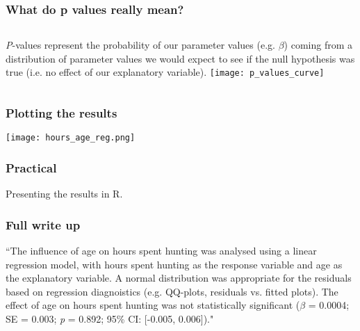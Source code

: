 \documentclass{beamer}
\begin{document}
\begin{frame}
  \frametitle{What do p values really mean?}
  \begin{columns}
  \textit{P}-values represent the probability of our parameter values (e.g. $\beta$) coming from a distribution of parameter values we would expect to see if the null hypothesis was true (i.e. no effect of our explanatory variable).  \vspace{0.5cm}
  \texttt{[image: p\_values\_curve]}
\end{columns}
\end{frame}
\begin{frame}
  \frametitle{Plotting the results}
  \centering
  \texttt{[image: hours\_age\_reg.png]}
\end{frame}
\begin{frame}
  \frametitle{Practical}
  Presenting the results in R.
\end{frame}
\begin{frame}
  \frametitle{Full write up}
  \begin{block}{}
    ``The influence of age on hours spent hunting was analysed using a linear regression model, with hours spent hunting as the response variable and age as the explanatory variable. A normal distribution was appropriate for the residuals based on regression diagnoistics (e.g. QQ-plots, residuals vs. fitted plots). The effect of age on hours spent hunting was not statistically significant ($\beta$ = 0.0004; SE = 0.003; \textit{p} = 0.892; 95\% CI: [-0.005, 0.006])."
  \end{block}
\end{frame}
\end{document}
